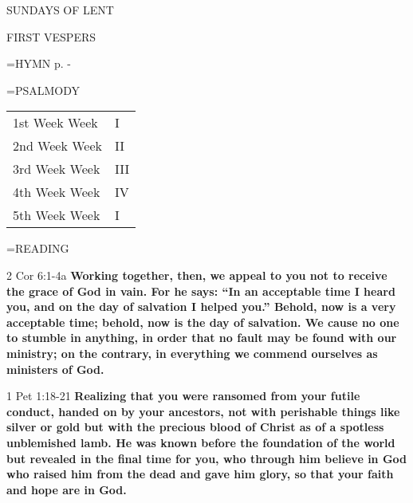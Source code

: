 \begin{center}\normalsize SUNDAYS OF LENT\\
\end{center}

\begin{flushleft}\normalsize FIRST VESPERS\\\end{flushleft}

\hangindent=\parindent \small{\uppercase{HYMN} p.  \pageref{lent:firstHymn} - \pageref{lent:lastHymn}\\}

\hangindent=\parindent \small{PSALMODY}
\begin{center}
\begin{tabular}{ l l }
1st Week	Week &  I\\
2nd Week	Week &  II\\
3rd Week	Week &  III\\
4th Week	Week &  IV\\
5th Week	Week &  I\\
\end{tabular}
\end{center}		

\hangindent=\parindent \small READING
\begin{description}[labelindent=\parindent, leftmargin=*]
\item [Weeks 1-4:]     2 Cor 6:1-4a \textbf{    Working together, then, we appeal to you not to receive the grace of God in vain. For he says: “In an acceptable time I heard you, and on the day of salvation I helped you.” Behold, now is a very acceptable time; behold, now is the day of salvation. We cause no one to stumble in anything, in order that no fault may be found with our ministry; on the contrary, in everything we commend ourselves as ministers of God.}
\item [Week 5:]     1 Pet 1:18-21 \textbf{    Realizing that you were ransomed from your futile conduct, handed on by your ancestors, not with perishable things like silver or gold but with the precious blood of Christ as of a spotless unblemished lamb. He was known before the foundation of the world but revealed in the final time for you, who through him believe in God who raised him from the dead and gave him glory, so that your faith and hope are in God. }
\end{description}

